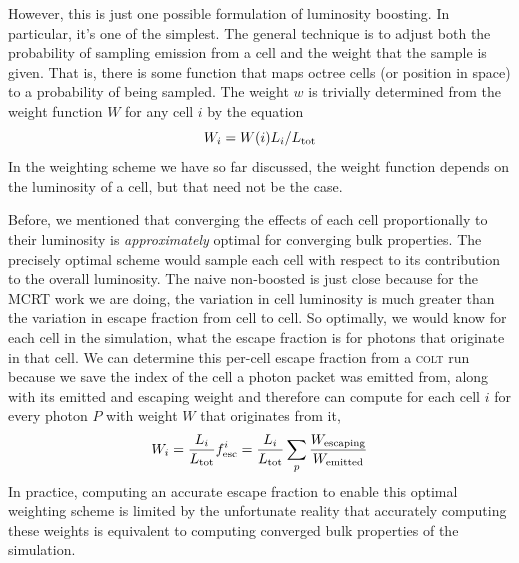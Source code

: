 However, this is just one possible formulation of luminosity boosting.
In particular, it's one of the simplest.
The general technique is to adjust both the probability of sampling emission from a cell and the weight that the sample is given.
That is, there is some function that maps octree cells (or position in space) to a probability of being sampled.
The weight $w$ is trivially determined from the weight function $W$ for any cell $i$ by the equation
\begin{equation}
    W_{i} = W(i)L_{i} / L_{\rm tot}
\end{equation}
In the weighting scheme we have so far discussed, the weight function depends on the luminosity of a cell, but that need not be the case.

Before, we mentioned that converging the effects of each cell proportionally to their luminosity is \emph{approximately} optimal for converging bulk properties.
The precisely optimal scheme would sample each cell with respect to its contribution to the overall luminosity.
The naive non-boosted is just close because for the MCRT work we are doing, the variation in cell luminosity is much greater than the variation in escape fraction from cell to cell.
So optimally, we would know for each cell in the simulation, what the escape fraction is for photons that originate in that cell.
We can determine this per-cell escape fraction from a \textsc{colt} run because we save the index of the cell a photon packet was emitted from, along with its emitted and escaping weight and therefore can compute for each cell $i$ for every photon $P$ with weight $W$ that originates from it,
\begin{equation}
    W_{i} = \frac{L_{i}}{L_{\rm tot}}f_{\rm esc}^{i} =\frac{L_{i}}{L_{\rm tot}} \sum_{p}\frac{W_{\rm escaping}}{W_{\rm emitted}}
\end{equation}
In practice, computing an accurate escape fraction to enable this optimal weighting scheme is limited by the unfortunate reality that accurately computing these weights is equivalent to computing converged bulk properties of the simulation.\\

